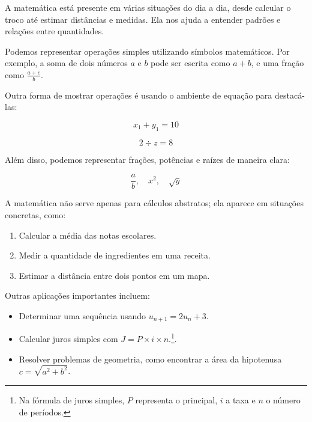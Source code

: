 \documentclass{article}
\begin{document}
A matemática está presente em várias situações do dia a dia, desde calcular o troco até estimar distâncias e medidas.  
Ela nos ajuda a entender padrões e relações entre quantidades.

Podemos representar operações simples utilizando símbolos matemáticos. Por exemplo, a soma de dois números $a$ e $b$ pode ser escrita como $a + b$, e uma fração  como $\frac{a + c}{b}$.

Outra forma de mostrar operações é usando o ambiente de equação para destacá-las:

\begin{equation}
x_1 + y_1 = 10
\end{equation}

\begin{equation}
2 \div z = 8
\end{equation}

Além disso, podemos representar frações, potências e raízes de maneira clara:

\begin{equation}
\frac{a}{b},\quad x^2, \quad \sqrt{y}
\end{equation}

A matemática não serve apenas para cálculos abstratos; ela aparece em situações concretas, como:

\begin{enumerate}
    \item Calcular a  média das notas escolares.  
    \item Medir a quantidade de ingredientes em uma receita.  
    \item Estimar a distância entre dois pontos em um mapa.
\end{enumerate}

Outras aplicações importantes incluem:

\begin{itemize}
    \item Determinar uma sequência usando $u_{n+1}=2u_{n}+3$.  
    \item Calcular juros simples com $J = P \times i \times n$.\footnote{Na fórmula de juros simples, \(P\) representa o principal, \(i\) a taxa e \(n\) o número de períodos.}.
    \item Resolver problemas de geometria, como encontrar a área da hipotenusa $c = \sqrt{a^2 + b^2}$.  
\end{itemize}
\end{document}
